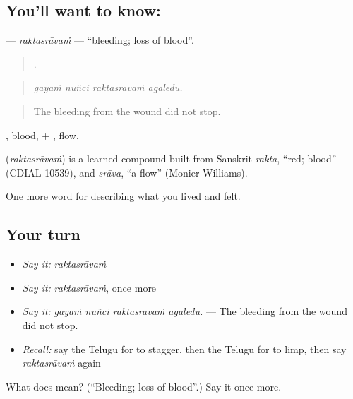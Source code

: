\subsection*{You'll want to know: }
\textbf{} — \emph{raktasrāvaṁ} — \textquotedblleft{}bleeding; loss of blood\textquotedblright{}.

\begin{quote}
   .
\end{quote}

\begin{quote}
\emph{gāyaṁ nuñci raktasrāvaṁ āgalēdu.}
\end{quote}

\begin{quote}
The bleeding from the wound did not stop.
\end{quote}

, blood, + , flow.

\begin{cousinweb}
\textbf{} (\emph{raktasrāvaṁ}) is a learned compound built from Sanskrit \emph{rakta}, \textquotedblleft{}red; blood\textquotedblright{} (CDIAL 10539), and \emph{srāva}, \textquotedblleft{}a flow\textquotedblright{} (Monier-Williams).
\end{cousinweb}

\begin{grammarlens}[title={What you've built}]
One more word for describing what you lived and felt.
\end{grammarlens}

\subsection*{Your turn}
\begin{itemize}
\raggedright
  \item \emph{Say it:} \emph{raktasrāvaṁ}
  \item \emph{Say it:} \emph{raktasrāvaṁ}, once more
  \item \emph{Say it:} \emph{gāyaṁ nuñci raktasrāvaṁ āgalēdu.} — The bleeding from the wound did not stop.
  \item \emph{Recall:} say the Telugu for to stagger, then the Telugu for to limp, then say \emph{raktasrāvaṁ} again
\end{itemize}

\begin{tcolorbox}[breakable,colback=teal!4,colframe=teal!35!black,title={Before you move on}]
What does  mean? (\textquotedblleft{}Bleeding; loss of blood\textquotedblright{}.) Say it once more.
\end{tcolorbox}
